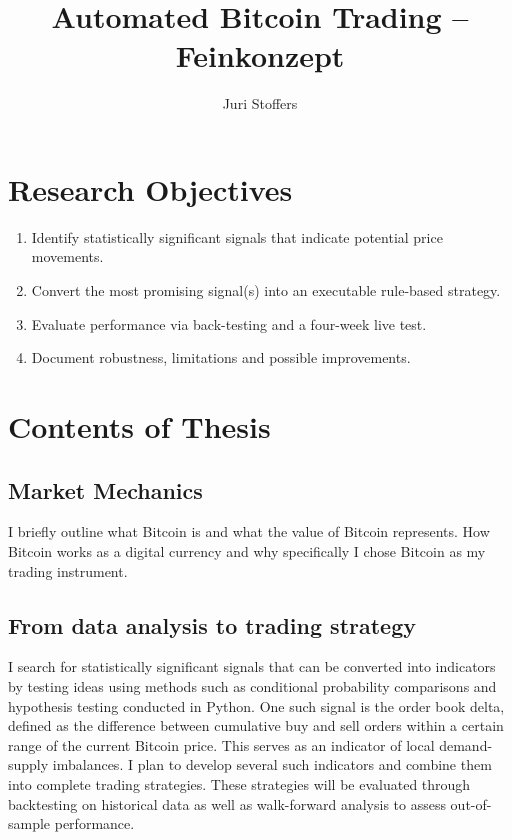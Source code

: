\documentclass[12pt,a4paper]{article}
\title{Automated Bitcoin Trading – Feinkonzept}
\author{Juri Stoffers}
\begin{document}
\maketitle
\tableofcontents
\newpage

\section{Research Objectives}
\begin{enumerate}
  \item Identify statistically significant signals that indicate potential price movements.
  \item Convert the most promising signal(s) into an executable rule-based strategy.
  \item Evaluate performance via back-testing and a four-week live test.
  \item Document robustness, limitations and possible improvements.
\end{enumerate}

\section{Contents of Thesis}
\subsection{Market Mechanics}
I briefly outline what Bitcoin is and what the value of Bitcoin represents. How Bitcoin works as a digital currency and why specifically I chose Bitcoin as my trading instrument.


\subsection{From data analysis to trading strategy}
I search for statistically significant signals that can be converted into indicators by testing ideas using methods such as conditional probability comparisons and hypothesis testing conducted in Python. One such signal is the order book delta, defined as the difference between cumulative buy and sell orders within a certain range of the current Bitcoin price. This serves as an indicator of local demand-supply imbalances.
I plan to develop several such indicators and combine them into complete trading strategies. These strategies will be evaluated through backtesting on historical data as well as walk-forward analysis to assess out-of-sample performance.
\end{document}

